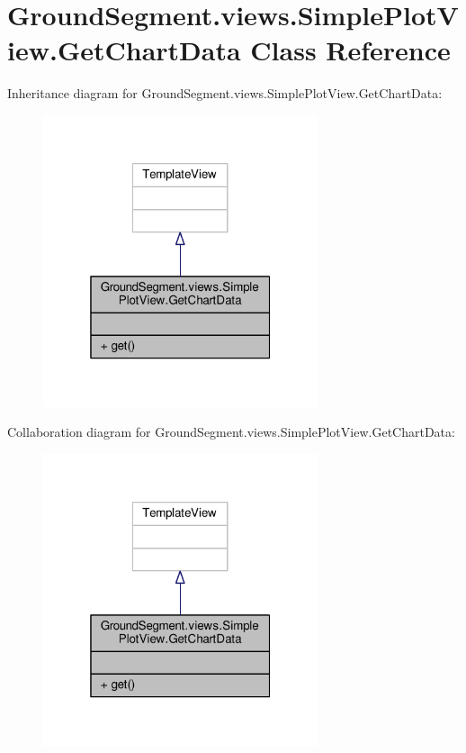 \hypertarget{class_ground_segment_1_1views_1_1_simple_plot_view_1_1_get_chart_data}{}\section{Ground\+Segment.\+views.\+Simple\+Plot\+View.\+Get\+Chart\+Data Class Reference}
\label{class_ground_segment_1_1views_1_1_simple_plot_view_1_1_get_chart_data}


Inheritance diagram for Ground\+Segment.\+views.\+Simple\+Plot\+View.\+Get\+Chart\+Data\+:\nopagebreak
\begin{figure}[H]
\begin{center}
\leavevmode
\includegraphics[width=229pt]{class_ground_segment_1_1views_1_1_simple_plot_view_1_1_get_chart_data__inherit__graph}
\end{center}
\end{figure}


Collaboration diagram for Ground\+Segment.\+views.\+Simple\+Plot\+View.\+Get\+Chart\+Data\+:\nopagebreak
\begin{figure}[H]
\begin{center}
\leavevmode
\includegraphics[width=229pt]{class_ground_segment_1_1views_1_1_simple_plot_view_1_1_get_chart_data__coll__graph}
\end{center}
\end{figure}
